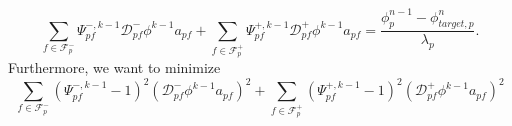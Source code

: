 \documentclass[../thesis.tex]{subfiles}
\begin{document}
\begin{equation}
	\sum_{f \in \mathcal{F}_p^-}
	\Psi_{pf}^{-,k-1}\mathcal{D}^-_{pf}\phi^{k-1} a_{pf}
	+ \sum_{f \in \mathcal{F}_p^+}
	\Psi_{pf}^{+,k-1}\mathcal{D}^+_{pf}\phi^{k-1} a_{pf}
	=
	\frac{\phi_p^{n-1} - \phi_{target,p}^n}{\lambda_p}.
\end{equation}
Furthermore, we want to minimize
\begin{equation}
	\sum_{f \in \mathcal{F}_p^-}
	\left( \Psi_{pf}^{-,k-1} - 1 \right)^2
	\left( \mathcal{D}^-_{pf}\phi^{k-1} a_{pf} \right)^2
	+ \sum_{f \in \mathcal{F}_p^+}
	\left( \Psi_{pf}^{+,k-1} - 1 \right)^2
	\left( \mathcal{D}^+_{pf}\phi^{k-1} a_{pf} \right)^2
\end{equation}
\end{document}
